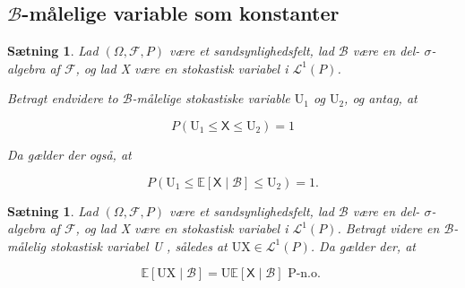 \documentclass{article}
\newcommand{\1}{\mathbbm{1}}
\newcommand{\X}{\mathsf{X}}
\theoremstyle{boxed}
\newtheorem{proposition}[theorem]{Sætning}
\begin{document}
\subsection{$\mathcal{B}$-målelige variable som konstanter}
\begin{theorem-box}
    \begin{proposition}
        Lad $(\Omega, \mathcal{F}, P)$ være et sandsynlighedsfelt, lad $\mathcal{B}$ være en del- $\sigma$-algebra af $\mathcal{F}$, og lad X være en stokastisk variabel i $\mathcal{L}^1(P)$.

Betragt endvidere to $\mathcal{B}$-målelige stokastiske variable $\mathrm{U}_1$ og $\mathrm{U}_2$, og antag, at

$$
P\left(\mathrm{U}_1 \leq \X \leq \mathrm{U}_2\right)=1
$$


Da gælder der også, at

$$
P\left(\mathrm{U}_1 \leq \mathbb{E}[\X \mid \mathcal{B}] \leq \mathrm{U}_2\right)=1 .
$$

    \end{proposition}
\end{theorem-box}
\begin{theorem-box}
    \begin{proposition}
        Lad $(\Omega, \mathcal{F}, P)$ være et sandsynlighedsfelt, lad $\mathcal{B}$ være en del- $\sigma$-algebra af $\mathcal{F}$, og lad X være en stokastisk variabel i $\mathcal{L}^1(P)$.
Betragt videre en $\mathcal{B}$-målelig stokastisk variabel U , således at $\mathrm{UX} \in \mathcal{L}^1(P)$.
Da gælder der, at

$$
\mathbb{E}[\mathrm{UX} \mid \mathcal{B}]=\mathrm{U} \mathbb{E}[\X \mid \mathcal{B}] \text { P-n.o. }
$$

    \end{proposition}
\end{theorem-box}
\end{document}
